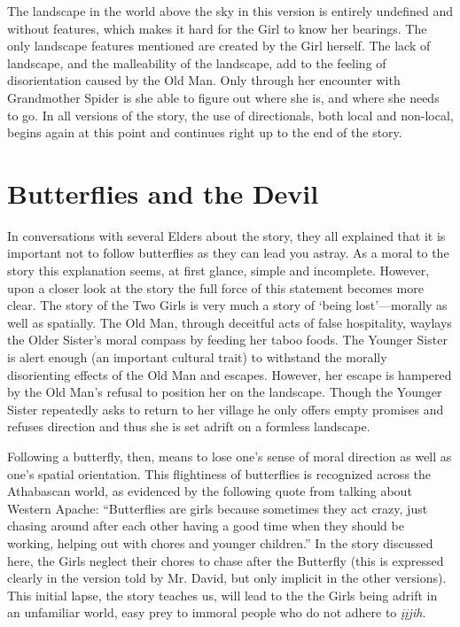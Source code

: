 The landscape in the world above the sky in this version is entirely undefined and without features, which makes it hard for the Girl to know her bearings. The only landscape features mentioned are created by the Girl herself. The lack of landscape, and the malleability of the landscape, add to the feeling of disorientation caused by the Old Man. Only through her encounter with Grandmother Spider is she able to figure out where she is, and where she needs to go.
In all versions of the story, the use of directionals, both local and non-local, begins again at this point and continues right up to the end of the story.

\section{Butterflies and the Devil}
\label{section:discussion}

In conversations with several Elders about the story, they all explained that it is important not to follow butterflies as they can lead you astray. As a moral to the story this explanation seems, at first glance, simple and incomplete. However, upon a closer look at the story the full force of this statement becomes more clear. The story of the Two Girls is very much a story of `being lost'—morally as well as spatially. The Old Man, through deceitful acts of false hospitality, waylays the Older Sister's moral compass by feeding her taboo foods. The Younger Sister is alert enough (an important cultural trait) to withstand the morally disorienting effects of the Old Man and escapes. However, her escape is hampered by the Old Man's refusal to position her on the landscape. Though the Younger Sister repeatedly asks to return to her village he only offers empty promises and refuses direction and thus she is set adrift on a formless landscape.

Following a butterfly, then, means to lose one's sense of moral direction as well as one's spatial orientation. This flightiness of butterflies is recognized across the Athabascan world, as evidenced by the following quote from \citet[61]{BassoK1990} talking about Western Apache: ``Butterflies are girls because sometimes they act crazy, just chasing around after each other having a good time when they should be working, helping out with chores and younger children.'' In the story discussed here, the Girls neglect their chores to chase after the Butterfly (this is expressed clearly in the version told by Mr. David, but only implicit in the other versions). This initial lapse, the story teaches us, will lead to the the Girls being adrift in an unfamiliar world, easy prey to immoral people who do not adhere to {\em įįjih}.

